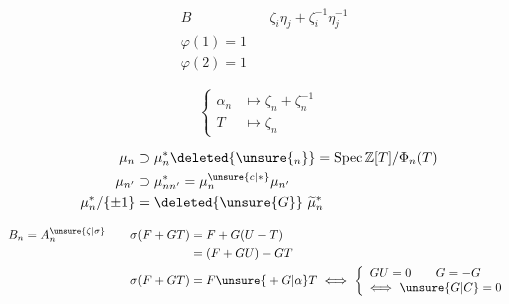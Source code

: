 


\[
\begin{aligned}
&B&&\zeta_i\eta_j+\zeta_i^{-1}\eta_j^{-1}\\
&\varphi(1)=1\\
&\varphi(2)=1
\end{aligned}
\]


\[
\left\{\begin{aligned}
\alpha_n&\longmapsto\zeta_n+\zeta_n^{-1}\\
T&\longmapsto\zeta_n
\end{aligned}\right.
\]

\[
\begin{aligned}
\mu_n&\supset\mu_n^*\deleted{\unsure{{}_n}}=\operatorname{Spec}\mathbb Z[T]/\Phi_n(T)\\
\mu_{n'}&\supset\mu_{nn'}^*=\mu_n^{\unsure{c|*}}\mu_{n'}\\
\mu_n^*/\{\pm1\}&=\deleted{\unsure{G}}\ \widetilde\mu_n^*
\end{aligned}
\]

\[
\begin{aligned}
B_n=A_n^{\unsure{\zeta|\sigma}}\qquad
\sigma(F+GT)&=F+G(U-T)\\
&=(F+GU)-GT\\
\sigma(F+GT)&=F\unsure{{}+G|\alpha}T\ \Longleftrightarrow\
\left\{\begin{array}{l}GU=0\qquad G=-G\\
\Longleftrightarrow\ \unsure{G|C}=0\end{array}\right.
\end{aligned}
\]

